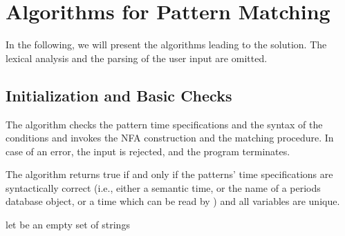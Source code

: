 \IncMargin{3mm}
\LinesNumbered

\section{Algorithms for Pattern Matching}
In the following, we will present the algorithms leading to the solution. The lexical analysis and the parsing of the user input are omitted.

\subsection{Initialization and Basic Checks}
The algorithm  checks the pattern time specifications and the syntax of the conditions and invokes the NFA construction and the matching procedure. In case of an error, the input is rejected, and the program terminates.

\begin{algorithm}
  \caption{\label{alg:matches}}
    \;
    \;
    \Return {}\;
\end{algorithm}

The algorithm  returns true if and only if the patterns' time specifications are syntactically correct (i.e., either a semantic time, or the name of a periods database object, or a time which can be read by \secondo) and all variables are unique.

\begin{algorithm}
  \caption{\label{alg:verifyPattern}}
    let  be an empty set of strings\;
    \Return {}\;
\end{algorithm}

